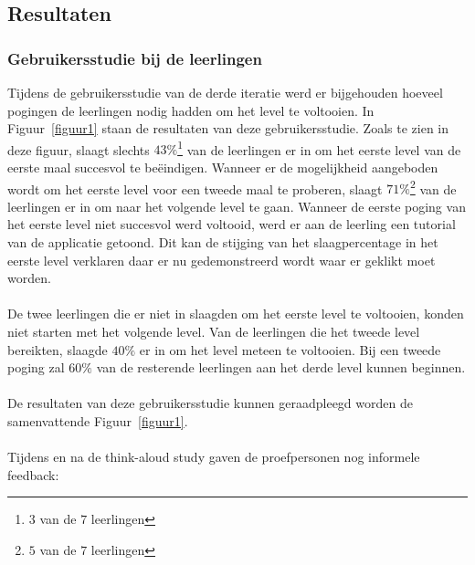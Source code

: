 \documentclass[11pt]{article}
\begin{document}
	\subsection{Resultaten}
    	\subsubsection{Gebruikersstudie bij de leerlingen}
Tijdens de gebruikersstudie van de derde iteratie werd er bijgehouden hoeveel pogingen de leerlingen nodig hadden om het level te voltooien. In Figuur~\ref{figuur1} staan de resultaten van deze gebruikersstudie. Zoals te zien in deze figuur, slaagt slechts $43\%$\footnote{$3$ van de $7$ leerlingen} van de leerlingen er in om het eerste level van de eerste maal succesvol te be\"eindigen. Wanneer er de mogelijkheid aangeboden wordt om het eerste level voor een tweede maal te proberen, slaagt $71\%$\footnote{$5$ van de $7$ leerlingen} van de leerlingen er in om naar het volgende level te gaan. Wanneer de eerste poging van het eerste level niet succesvol werd voltooid, werd er aan de leerling een tutorial van de applicatie getoond. Dit kan de stijging van het slaagpercentage in het eerste level verklaren daar er nu gedemonstreerd wordt waar er geklikt moet worden.\\\\
De twee leerlingen die er niet in slaagden om het eerste level te voltooien, konden niet starten met het volgende level. Van de leerlingen die het tweede level bereikten, slaagde $40\%$ er in om het level meteen te voltooien. Bij een tweede poging zal $60\%$ van de resterende leerlingen aan het derde level kunnen beginnen.\\\\
De resultaten van deze gebruikersstudie kunnen geraadpleegd worden de samenvattende Figuur~\ref{figuur1}.\\\\
Tijdens en na de think-aloud study gaven de proefpersonen nog informele feedback:
\end{document}
